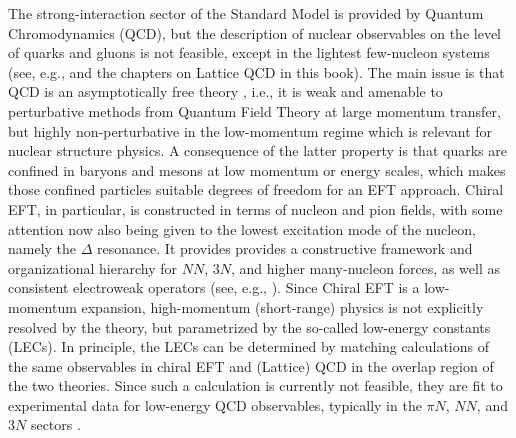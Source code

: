 The strong-interaction sector of the Standard Model is provided by
Quantum Chromodynamics (QCD), but the description of nuclear observables
on the level of quarks and gluons is not feasible, except in the lightest
few-nucleon systems (see, e.g., \cite{Detmold:2015xw} and the chapters on
Lattice QCD in this book). The main issue is that QCD is an asymptotically
free theory \cite{Gross:1973pd,Politzer:1973lq}, i.e., it is weak and amenable 
to perturbative methods from Quantum Field Theory at large momentum transfer, 
but highly non-perturbative in the low-momentum regime which is relevant for 
nuclear structure physics. A consequence of the latter property is that 
quarks are confined in baryons and mesons at low momentum or energy scales,
which makes those confined particles suitable degrees of freedom for an
EFT approach. Chiral EFT, in particular, is constructed in terms of 
nucleon and pion fields, with some attention now also being given to the
lowest excitation mode of the nucleon, namely the $\Delta$ resonance.
It provides provides a constructive framework and organizational hierarchy
for $NN$, $3N$, and higher many-nucleon forces, as well as consistent
electroweak operators (see, e.g., \cite{Epelbaum:2009ve,Machleidt:2011bh,Epelbaum:2015gf,Entem:2015qf,Gezerlis:2014zr,Lynn:2016ec,Pastore:2009zr,Pastore:2011dq,Piarulli:2013vn,Kolling:2009yq,Kolling:2011bh}).
Since Chiral EFT is a low-momentum expansion, high-momentum (short-range)
physics is not explicitly resolved by the theory, but parametrized
by the so-called low-energy constants (LECs). 
In principle, the LECs can be determined by matching calculations of
the same observables in chiral EFT and (Lattice) QCD in the overlap
region of the two theories. Since such a calculation is currently not 
feasible, they are fit to experimental data for low-energy QCD observables, 
typically in the $\pi{}N$, $NN$, and $3N$ sectors \cite{Epelbaum:2009ve,Machleidt:2011bh,Ekstrom:2015fk,Shirokov:2016wo}.

